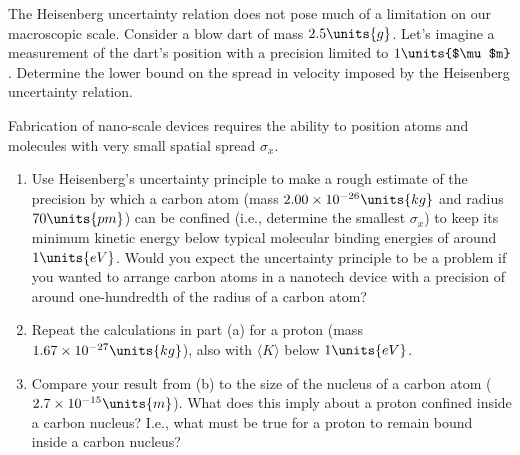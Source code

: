 
\begin{problem}
  The Heisenberg uncertainty relation does not pose much of a
  limitation on our macroscopic scale.  Consider a blow dart of mass
  $2.5\units{g}$.  Let's imagine a measurement of the dart's position
  with a precision limited to $1\units{$\mu$m}$.  Determine the lower 
  bound on the spread in velocity imposed by the Heisenberg uncertainty 
  relation.
\label{prob:UncertaintyBlowDart}
\end{problem}

\newpage


\begin{problem}
Fabrication of nano-scale devices requires the ability to position atoms
and molecules with very small spatial spread $\sigma_x$.

\begin{enumerate}

\item Use Heisenberg's uncertainty principle to make a rough
estimate of the precision by which a carbon atom (mass $2.00 \times
10^{-26}\units{kg}$ and radius $70\units{pm}$) can be confined (i.e.,
determine the smallest $\sigma_x$) to keep its minimum kinetic energy
below typical molecular binding energies of around $1\units{eV}$.
Would you expect the uncertainty principle to be a problem if you wanted
to arrange carbon atoms in a nanotech device with a precision of around
one-hundredth of the radius of a carbon atom?

\item Repeat the calculations in part (a) for a proton (mass 
$1.67 \times 10^{-27}\units{kg}$), also with $\langle K\rangle$ 
below $1\units{eV}$. 

\item 
Compare your result from (b) to the
size of the nucleus of a carbon atom ($2.7 \times 10^{-15}\units{m}$).
What does this imply about a proton confined inside a carbon nucleus?
I.e., what must be true for a proton to remain bound inside a carbon 
nucleus?

\end{enumerate}
\label{prob:NanoscaleUncertainty}
\end{problem}


